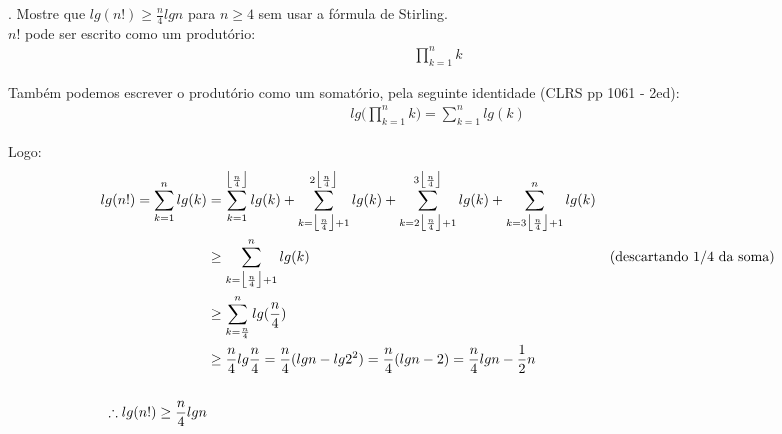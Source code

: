 
. Mostre que $lg(n!) \geq \frac{n}{4} lg n$ para $n \geq 4$ sem usar a fórmula de Stirling.\\[6pt]
$n!$ pode ser escrito como um produtório:
\begin{align*}
\prod_{k=1}^n k
\end{align*}

Também podemos escrever o produtório como um somatório, pela seguinte identidade (CLRS pp 1061 - 2ed):
\begin{align*}
lg\big(\prod_{k=1}^n k\big) = \sum_{k=1}^n lg(k)
\end{align*}

Logo:
\begin{align*}
lg(n!) = \sum_{k=1}^n lg(k) &= \sum_{k=1}^{\big\lfloor\frac{n}{4}\big\rfloor} lg(k) + \sum_{k=\big\lfloor\frac{n}{4}\big\rfloor + 1}^{2\big\lfloor\frac{n}{4}\big\rfloor} lg(k) + \sum_{k=2\big\lfloor\frac{n}{4}\big\rfloor + 1}^{3\big\lfloor\frac{n}{4}\big\rfloor} lg(k) + \sum_{k=3\big\lfloor\frac{n}{4}\big\rfloor + 1}^{n} lg(k) \\
&\geq \sum_{k=\big\lfloor\frac{n}{4}\big\rfloor + 1}^{n} lg(k) & \text{(descartando 1/4 da soma)} \\
&\geq \sum_{k=\frac{n}{4}}^n lg(\frac{n}{4}) \\
&\geq \frac{n}{4}lg\frac{n}{4} = \frac{n}{4}(lg n - lg 2^2) = \frac{n}{4}(lg n - 2) = \frac{n}{4}lg n - \frac{1}{2}n\\\\
\therefore lg(n!) \geq \frac{n}{4}lg n
\end{align*}

